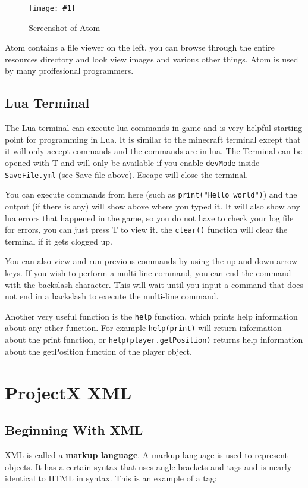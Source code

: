 \documentclass{book}
\newcommand{\fFigure}[2]
	{\begin{figure}[ht!]
		\centering
		\texttt{[image: \#1]}
		\caption{#2}
	\end{figure}}
\begin{document}
	\fFigure{Atom.png}{Screenshot of Atom}

	Atom contains a file viewer on the left, you can browse through the entire resources directory and look view images and various other things. Atom is used by many proffesional programmers.

	\section{Lua Terminal}
	The Lua terminal can execute lua commands in game and is very helpful starting point for programming in Lua. It is similar to the minecraft terminal except that it will only accept commands and the commands are in lua. The Terminal can be opened with T and will only be available if you enable \texttt{devMode} inside \texttt{SaveFile.yml} (see Save file above). Escape will close the terminal.

	You can execute commands from here (such as \texttt{print("Hello world")}) and the output (if there is any) will show above where you typed it. It will also show any lua errors that happened in the game, so you do not have to check your log file for errors, you can just press T to view it. the \texttt{clear()} function will clear the terminal if it gets clogged up.
	
	You can also view and run previous commands by using the up and down arrow keys. If you wish to perform a multi-line command, you can end the command with the backslash character. This will wait until you input a command that does not end in a backslash to execute the multi-line command.
	
	Another very useful function is the \texttt{help} function, which prints help information about any other function. For example \texttt{help(print)} will return information about the print function, or \texttt{help(player.getPosition)} returns help information about the getPosition function of the player object.

	\chapter{ProjectX XML}
	\section{Beginning With XML}
	XML is called a \textbf{markup language}. A markup language is used to represent objects. It has a certain syntax that uses angle brackets and tags and is nearly identical to HTML in syntax. This is an example of a tag:
	
\end{document}
